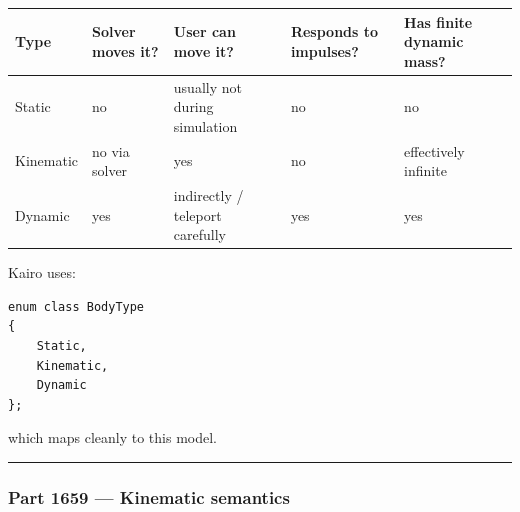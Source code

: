 {\def\LTcaptype{none} %
\begin{longtable}[]{@{}
  >{\raggedright\arraybackslash}p{}
  >{\raggedleft\arraybackslash}p{}
  >{\raggedleft\arraybackslash}p{}
  >{\raggedleft\arraybackslash}p{}
  >{\raggedleft\arraybackslash}p{}@{}}
\toprule\noalign{}
\begin{minipage}[b]{\linewidth}\raggedright
Type
\end{minipage} & \begin{minipage}[b]{\linewidth}\raggedleft
Solver moves it?
\end{minipage} & \begin{minipage}[b]{\linewidth}\raggedleft
User can move it?
\end{minipage} & \begin{minipage}[b]{\linewidth}\raggedleft
Responds to impulses?
\end{minipage} & \begin{minipage}[b]{\linewidth}\raggedleft
Has finite dynamic mass?
\end{minipage} \\
\midrule\noalign{}
\endhead
\bottomrule\noalign{}
\endlastfoot
Static & no & usually not during simulation & no & no \\
Kinematic & no via solver & yes & no & effectively infinite \\
Dynamic & yes & indirectly / teleport carefully & yes & yes \\
\end{longtable}
}

Kairo uses:

\begin{verbatim}
enum class BodyType
{
    Static,
    Kinematic,
    Dynamic
};
\end{verbatim}

which maps cleanly to this model.

\begin{center}\rule{0.5\linewidth}{0.5pt}\end{center}

\subsubsection{Part 1659 --- Kinematic semantics}\label{part-1659-kinematic-semantics}

